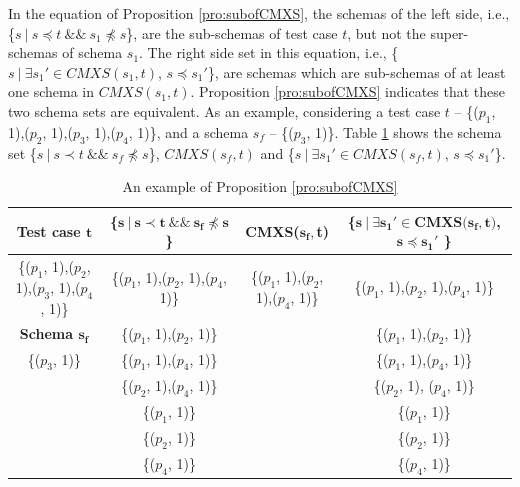 
In the equation of Proposition \ref{pro:subofCMXS}, the schemas of the left side, i.e., \{$s\ |\ s \preceq t\ \&\&\ s_{1} \npreceq s$\}, are the sub-schemas of test case $t$, but not the super-schemas of  schema $s_{1}$.  The right side set in this equation, i.e., \{$ s\ |\ \exists s_{1}' \in CMXS(s_{1}, t)$, $s \preceq s_{1}'$\}, are schemas which are sub-schemas of at least one schema in $CMXS(s_{1}, t)$. Proposition \ref{pro:subofCMXS} indicates that these two schema sets are equivalent. As an example, considering a test case $t$ -- \{($p_{1}$, 1),($p_{2}$, 1),($p_{3}$, 1),($p_{4}$, 1)\}, and a schema $s_{f}$ --  \{($p_{3}$, 1)\}. Table \ref{examleOfCMXSPro} shows the schema set  \{$s\ |\ s \prec t\ \&\&\ s_{f} \npreceq s$\}, $CMXS(s_{f}, t)$ and \{$ s\ |\ \exists s_{1}' \in CMXS(s_{f}, t)$, $s \preceq s_{1}'$\}.

\begin{table}[ht]
  \centering
  \setlength{\tabcolsep}{2pt}
  \caption{An example of Proposition \ref{pro:subofCMXS}}
  {\footnotesize
    \begin{tabular}{|c|c|c|c|}
    \hline
  \textbf{  Test case $\textbf{t}$} & \textbf{ \{$\textbf{s}\ |\ \textbf{s} \prec \textbf{t}\ \&\&\ \textbf{s}_{\textbf{f}} \npreceq \textbf{s}$\} }& \textbf{ CMXS($\textbf{s}_{\textbf{f}}, $\textbf{t}$ $)} & \textbf{\{$ \textbf{s}\ |\ \exists \textbf{s}_{\textbf{1}}' \in \textbf{CMXS}\textbf{(}\textbf{s}_{\textbf{f}}, \textbf{t}\textbf{)}$, $\textbf{s} \preceq \textbf{s}_{\textbf{1}}'$ \}}\\\hline
    \{($p_{1}$, 1),($p_{2}$, 1),($p_{3}$, 1),($p_{4}$, 1)\}  & \{($p_{1}$, 1),($p_{2}$, 1),($p_{4}$, 1)\} & \{($p_{1}$, 1),($p_{2}$, 1),($p_{4}$, 1)\} & \{($p_{1}$, 1),($p_{2}$, 1),($p_{4}$, 1)\}\\ \cline{1-1}
      \textbf{Schema $\textbf{s}_{\textbf{f}}$}  & \{($p_{1}$, 1),($p_{2}$, 1)\} &  & \{($p_{1}$, 1),($p_{2}$, 1)\} \\\cline{1-1}
     \{($p_{3}$, 1)\}         & \{($p_{1}$, 1),($p_{4}$, 1)\}&  &\{($p_{1}$, 1),($p_{4}$, 1)\}\\
          &       \{($p_{2}$, 1),($p_{4}$, 1)\} &  &\{($p_{2}$, 1), ($p_{4}$, 1)\}\\
          &       \{($p_{1}$, 1)\} &  &\{($p_{1}$, 1)\}\\
          &       \{($p_{2}$, 1)\} &  &\{($p_{2}$, 1)\}\\
          &       \{($p_{4}$, 1)\} &  & \{($p_{4}$, 1)\}\\\hline
    \end{tabular}}%
  \label{examleOfCMXSPro}%
\end{table}%

